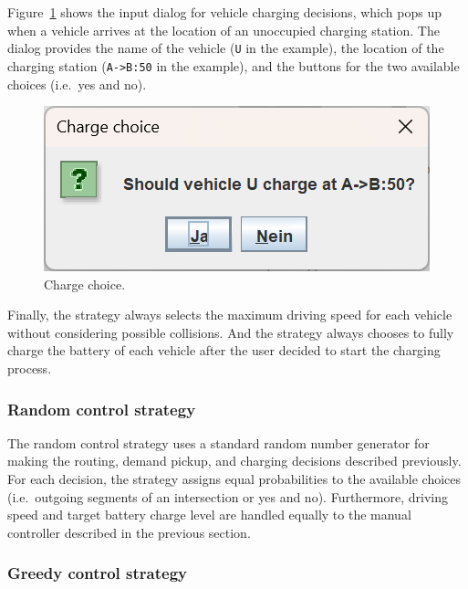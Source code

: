 \documentclass[10pt,twocolumn]{article}
\begin{document}
Figure~\ref{fig:manual-controller-charge} shows the input dialog for vehicle charging decisions, which pops up when a vehicle arrives at the location of an unoccupied charging station.
The dialog provides the name of the vehicle (\texttt{U} in the example), the location of the charging station (\texttt{A->B:50} in the example), and the buttons for the two available choices (i.e.\ yes and no).

\begin{figure}[!ht]
    \centering
    \includegraphics[scale=0.4]{../../screenshots/manual-controller-charge.png}
    \caption{Charge choice.}
    \label{fig:manual-controller-charge}
\end{figure}

Finally, the strategy always selects the maximum driving speed for each vehicle without considering possible collisions.
And the strategy always chooses to fully charge the battery of each vehicle after the user decided to start the charging process.

\subsubsection*{Random control strategy}
\label{sec:controller-random}

The random control strategy uses a standard random number generator for making the routing, demand pickup, and charging decisions described previously.
For each decision, the strategy assigns equal probabilities to the available choices (i.e.\ outgoing segments of an intersection or yes and no).
Furthermore, driving speed and target battery charge level are handled equally to the manual controller described in the previous section.

\subsubsection*{Greedy control strategy}
\label{sec:controller-greedy}
\end{document}
